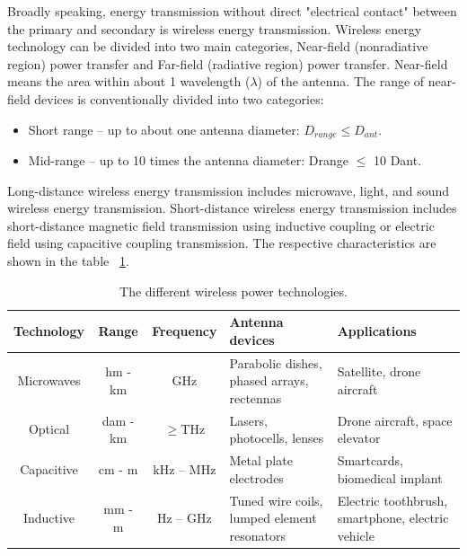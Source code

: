 Broadly speaking, energy transmission without direct "electrical contact" between the primary and secondary is wireless energy transmission. Wireless energy technology can be divided into two main categories, Near-field (nonradiative region) power transfer and Far-field (radiative region) power transfer. 
Near-field means the area within about 1 wavelength ($\lambda$) of the antenna.  The range of near-field devices is conventionally divided into two categories:
\begin{itemize}
    \item  Short range – up to about one antenna diameter: $D_{range} \leq D_{ant}$.
    \item Mid-range – up to 10 times the antenna diameter: Drange $\leq$ 10 Dant.
  \end{itemize} 

Long-distance wireless energy transmission includes microwave, light, and sound wireless energy transmission. Short-distance wireless energy transmission includes short-distance magnetic field transmission using inductive coupling or electric field using capacitive coupling transmission. The respective characteristics are shown in the table ~\ref{table:differentWPT}.

\begin{table}[htbp]
    \centering
    \caption{The different wireless power technologies.}
    \begin{tabular}{ |c|c|c|m{3.5cm}<{\centering}|m{3.5cm}<{\centering}| }
        \hline
        \textbf{Technology} & \textbf{Range} & \textbf{Frequency}         & \textbf{Antenna devices}                    & \textbf{Applications}                             \\\hline
Microwaves          & hm - km        & GHz                        & Parabolic dishes, phased arrays, rectennas  & Satellite, drone aircraft                         \\ \hline
Optical             & dam - km
                    & $\geq$THz      & Lasers, photocells, lenses & Drone aircraft, space elevator                                                                  \\ \hline
Capacitive          & cm - m         & kHz – MHz                  & Metal plate electrodes                      & Smartcards, biomedical implant
\\ \hline
Inductive           & mm - m         & Hz – GHz                   & Tuned wire coils, lumped element resonators & Electric toothbrush, smartphone, electric vehicle
\\ \hline
    \end{tabular}
    \label{table:differentWPT}
\end{table}



